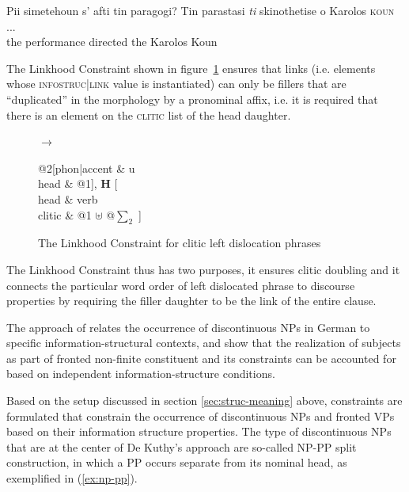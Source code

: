 \documentclass[output=paper]{langsci/langscibook}
\begin{document}
\begin{exe}
  \ex\label{ex:clld-greek}
  \begin{xlist}
    \ex Pii simetehoun s' afti tin paragogi?
    \ex \gll Tin parastasi \textit{ti} skinothetise o Karolos \textsc{koun} ...\\
              the performance {} directed the Karolos Koun\\
  \end{xlist}

\end{exe}

The Linkhood Constraint shown in figure~\ref{fig:clld-constraint}
ensures that links (i.e. elements whose \textsc{infostruc|link} value
is instantiated) can only be fillers that are ``duplicated'' in the
morphology by a pronominal affix, i.e. it is required that there is an
element on the \textsc{clitic} list of the head daughter.

\begin{figure}[htb]
  \centering
  \begin{avm}
  \end{avm}
$\to$\ 
\begin{avm}
  @2[phon|accent & u\\
     head & @1], \textbf{H} [\\
                              head & verb\\
                              clitic & {@1} $\uplus$ @{$\sum_2$} ]
\end{avm}
  \caption{The Linkhood Constraint for clitic left dislocation phrases}
  \label{fig:clld-constraint}
\end{figure}

The Linkhood Constraint thus has two purposes, it ensures clitic
doubling and it connects the particular word order of left dislocated
phrase to discourse properties by requiring the filler daughter to be
the link of the entire clause.

The approach of \cite{deKuthy2002a} relates
the occurrence of discontinuous NPs in German to specific
information-structural contexts, and \citet{dKM2003a}
show that the realization of subjects as part of fronted non-finite
constituent and its constraints can be accounted for based on
independent information-structure conditions.

Based on the setup discussed in section \ref{sec:struc-meaning} above,
constraints are formulated that constrain the occurrence of
discontinuous NPs and fronted VPs based on their information structure
properties. The type of discontinuous NPs that are at the center of De
Kuthy's approach are so-called NP-PP split construction, in which a PP
occurs separate from its nominal head, as exemplified in
(\ref{ex:np-pp}).
\end{document}
